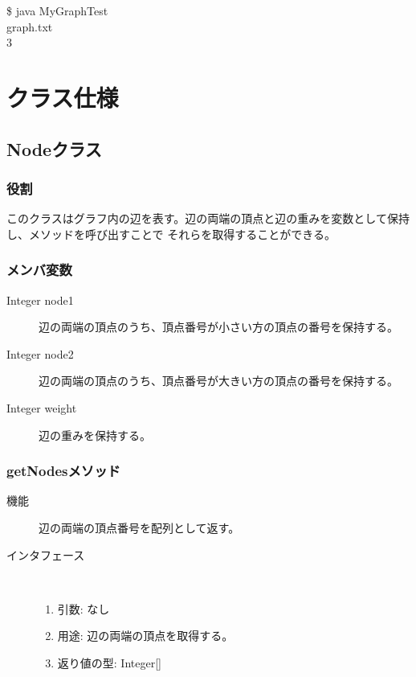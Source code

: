 \documentclass[a4j]{jarticle}
\begin{document}
\begin{screen}
\$ java MyGraphTest \\
graph.txt  \\
3
\end{screen}

\section{クラス仕様}

\subsection{Nodeクラス}

\subsubsection{役割}
このクラスはグラフ内の辺を表す。辺の両端の頂点と辺の重みを変数として保持し、メソッドを呼び出すことで
それらを取得することができる。

\subsubsection{メンバ変数}

\begin{description}
\item[Integer node1]
辺の両端の頂点のうち、頂点番号が小さい方の頂点の番号を保持する。

\item[Integer node2]
辺の両端の頂点のうち、頂点番号が大きい方の頂点の番号を保持する。

\item[Integer weight]
辺の重みを保持する。

\end{description}

\subsubsection{getNodesメソッド}

\begin{description}
\item[機能]
辺の両端の頂点番号を配列として返す。

\item[インタフェース]\ \vspace{0mm}
\begin{enumerate}
  \item 引数: なし
  \item 用途: 辺の両端の頂点を取得する。
  \item 返り値の型: Integer[]
\end{enumerate}
\end{description}
\end{document}

